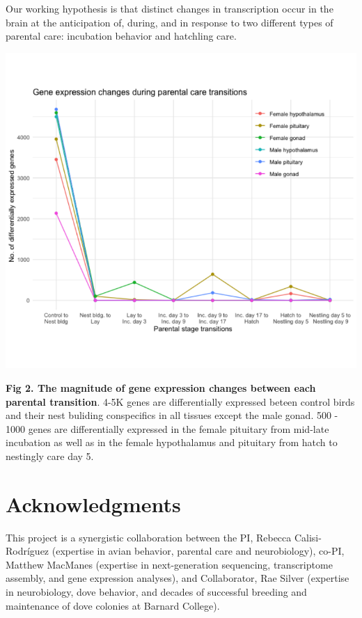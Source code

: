 \documentclass[10pt,letterpaper]{article}
\begin{document}
Our working hypothesis is that distinct changes in transcription occur
in the brain at the anticipation of, during, and in response to two
different types of parental care: incubation behavior and hatchling
care.

\includegraphics{characterization_manuscript_files/figure-latex/unnamed-chunk-4-1.pdf}

\textbf{Fig 2. The magnitude of gene expression changes between each
parental transition}. 4-5K genes are differentially expressed beteen
control birds and their nest buliding conspecifics in all tissues except
the male gonad. 500 - 1000 genes are differentially expressed in the
female pituitary from mid-late incubation as well as in the female
hypothalamus and pituitary from hatch to nestingly care day 5.

\hypertarget{acknowledgments}{%
\section{Acknowledgments}\label{acknowledgments}}

This project is a synergistic collaboration between the PI, Rebecca
Calisi-Rodríguez (expertise in avian behavior, parental care and
neurobiology), co-PI, Matthew MacManes (expertise in next-generation
sequencing, transcriptome assembly, and gene expression analyses), and
Collaborator, Rae Silver (expertise in neurobiology, dove behavior, and
decades of successful breeding and maintenance of dove colonies at
Barnard College).
\end{document}
